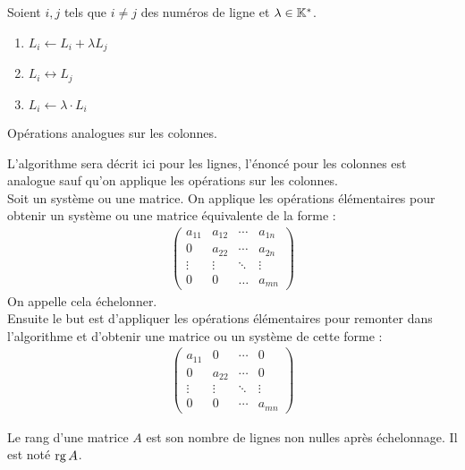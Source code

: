 \begin{definition}
	Soient $i, j$ tels que $i \neq j$ des numéros de ligne et $\lambda \in \mathbb{K}^*$.
	\begin{multicols}{2}
        \begin{enumerate}
		\item $L_i \leftarrow L_i + \lambda L_j$ 
		\item $L_i \leftrightarrow L_j$
		\item $L_i \leftarrow \lambda \cdot L_i$
	\end{enumerate}
    \end{multicols}
	Opérations analogues sur les colonnes.
\end{definition}

\begin{proposition}
    L'algorithme sera décrit ici pour les lignes, l'énoncé pour les colonnes est analogue sauf qu'on applique les opérations sur les colonnes. \\
	Soit un système ou une matrice. On applique les opérations élémentaires pour obtenir un système ou une matrice équivalente de la forme :
	\begin{align*}
		\begin{pmatrix}
			a_{11} & a_{12} & \cdots & a_{1n} \\
			0 & a_{22} & \cdots & a_{2n} \\
			\vdots & \vdots & \ddots & \vdots \\
			0 & 0 & \ldots & a_{mn}
		\end{pmatrix}
	\end{align*}
	On appelle cela échelonner.
    \\
    Ensuite le but est d'appliquer les opérations élémentaires pour \og remonter \fg dans l'algorithme et d'obtenir une matrice ou un système de cette forme :
    \begin{align*}
        \begin{pmatrix}
            a_{11} & 0 & \cdots & 0 \\
            0 & a_{22} & \cdots & 0 \\ 
            \vdots & \vdots & \ddots & \vdots \\ 
            0 & 0 & \cdots & a_{mn}
        \end{pmatrix}
    \end{align*}
\end{proposition}

\begin{definition}
	Le rang d'une matrice $A$ est son nombre de lignes non nulles après échelonnage. Il est noté $\operatorname{rg}{A}$.
\end{definition}

